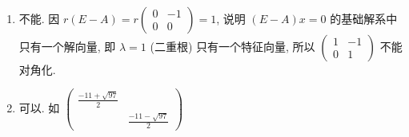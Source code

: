 	 \paragraph{} %
		 \begin{enumerate}
			 \item %
			       不能. 因 \( r(E - A) = r\begin{pmatrix}
				       0 & -1 \\
				       0 & 0
			       \end{pmatrix} = 1 \), 说明 \( (E - A)x = 0 \) 的基础解系中只有一个解向量, 即 \( \lambda = 1 \) (二重根) 只有一个特征向量, 所以 \( \begin{pmatrix}
				       1 & -1 \\
				       0 & 1
			       \end{pmatrix} \) 不能对角化.
			 \item %
			       可以. 如 \( \begin{pmatrix}
				       \frac{-11 + \sqrt{97}}{2} &                           \\
				                                 & \frac{-11 - \sqrt{97}}{2}
			       \end{pmatrix} \)
		 \end{enumerate}

